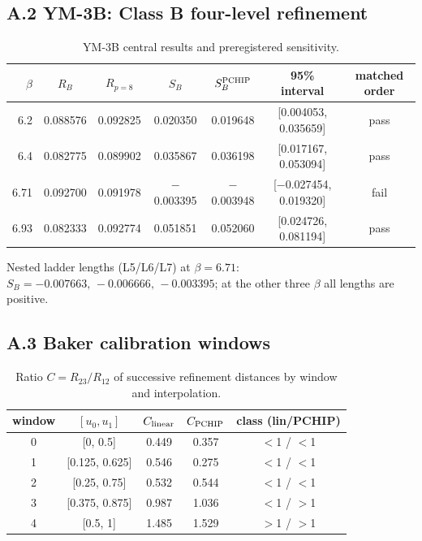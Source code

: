 \documentclass[11pt,a4paper]{article}
\theoremstyle{definition}
\theoremstyle{remark}
\begin{document}
\subsection*{A.2 YM-3B: Class B four-level refinement}
\begin{table}[ht]\centering\small\caption{YM-3B central results and preregistered sensitivity.}\label{tab:ym3b}
\begin{tabular}{@{}rcccccc@{}}\toprule $\beta$ & $R_B$ & $R_{p=8}$ & $S_B$ & $S_B^{\rm PCHIP}$ & 95\% interval & matched order\\\midrule
6.2 & 0.088576 & 0.092825 & 0.020350 & 0.019648 & [0.004053, 0.035659] & pass\\
6.4 & 0.082775 & 0.089902 & 0.035867 & 0.036198 & [0.017167, 0.053094] & pass\\
6.71 & 0.092700 & 0.091978 & $-$0.003395 & $-$0.003948 & [$-$0.027454, 0.019320] & fail\\
6.93 & 0.082333 & 0.092774 & 0.051851 & 0.052060 & [0.024726, 0.081194] & pass\\
\bottomrule\end{tabular}\end{table}
\noindent Nested ladder lengths (L5/L6/L7) at $\beta=6.71$: $S_B=-0.007663,\,-0.006666,\,-0.003395$; at the other three $\beta$ all lengths are positive.
\subsection*{A.3 Baker calibration windows}
\begin{table}[ht]\centering\small\caption{Ratio $C=R_{23}/R_{12}$ of successive refinement distances by window and interpolation.}
\begin{tabular}{@{}ccccc@{}}\toprule window & $[u_0,u_1]$ & $C_{\rm linear}$ & $C_{\rm PCHIP}$ & class (lin/PCHIP)\\\midrule
0 & [0, 0.5] & 0.449 & 0.357 & $<$1 / $<$1\\
1 & [0.125, 0.625] & 0.546 & 0.275 & $<$1 / $<$1\\
2 & [0.25, 0.75] & 0.532 & 0.544 & $<$1 / $<$1\\
3 & [0.375, 0.875] & 0.987 & 1.036 & $<$1 / $>$1\\
4 & [0.5, 1] & 1.485 & 1.529 & $>$1 / $>$1\\
\bottomrule\end{tabular}\end{table}
\end{document}
